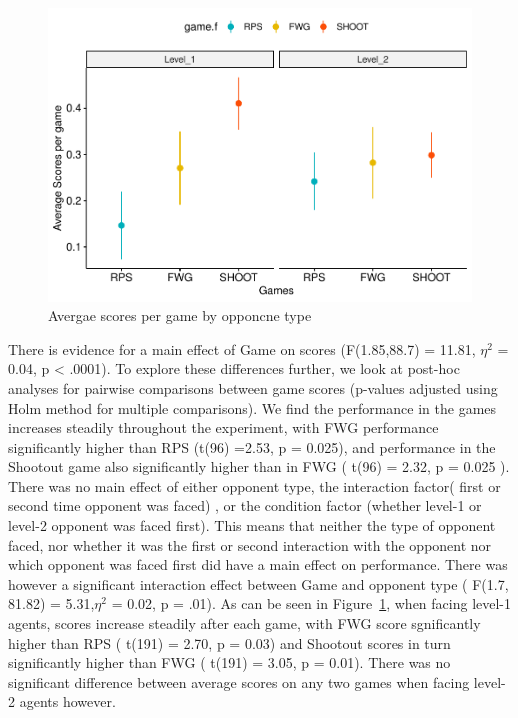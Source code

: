 \documentclass[man,floatsintext]{apa6}
\begin{document}
\begin{figure}

{\centering \includegraphics{draft_report_v1_files/figure-latex/exp2-score-by-opp-1} 

}

\caption{Avergae scores per game by opponcne type}\label{fig:exp2-score-by-opp}
\end{figure}

There is evidence for a main effect of Game on scores (F(1.85,88.7) = 11.81, \(\eta^{2}\) = 0.04, p \textless{} .0001). To explore these differences further, we look at post-hoc analyses for pairwise comparisons between game scores (p-values adjusted using Holm method for multiple comparisons). We find the performance in the games increases steadily throughout the experiment, with FWG performance significantly higher than RPS (t(96) =2.53, p = 0.025), and performance in the Shootout game also significantly higher than in FWG ( t(96) = 2.32, p = 0.025 ). There was no main effect of either opponent type, the interaction factor( first or second time opponent was faced) , or the condition factor (whether level-1 or level-2 opponent was faced first). This means that neither the type of opponent faced, nor whether it was the first or second interaction with the opponent nor which opponent was faced first did have a main effect on performance. There was however a significant interaction effect between Game and opponent type ( F(1.7, 81.82) = 5.31,\(\eta^{2}\) = 0.02, p = .01). As can be seen in Figure~\ref{fig:exp2-score-by-opp}, when facing level-1 agents, scores increase steadily after each game, with FWG score sgnificantly higher than RPS ( t(191) = 2.70, p = 0.03) and Shootout scores in turn significantly higher than FWG ( t(191) = 3.05, p = 0.01). There was no significant difference between average scores on any two games when facing level-2 agents however.
\end{document}
